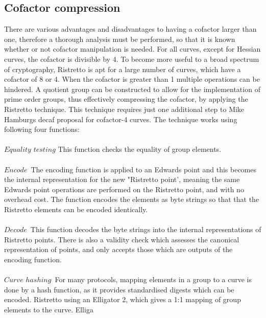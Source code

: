 \documentclass{article}
\begin{document}
\subsection{Cofactor compression}
There are various advantages and disadvantages to having a cofactor larger than one, therefore a thorough analysis must be performed,  so that it is known whether or not cofactor manipulation is needed. For all curves, except for Hessian curves, the cofactor is divisible by 4. To become more useful to a broad spectrum of cryptography, Ristretto is apt for a large number of curves, which have a cofactor of 8 or 4. When the cofactor is greater than 1 multiple operations can be hindered. A quotient group can be constructed to allow for the implementation of prime order groups, thus effectively compressing the cofactor, by applying the Ristretto technique. This technique requires just one additional step to Mike Hamburgs decaf proposal for cofactor-4 curves. The technique works using following four functions:\\\\   
${Equality}$ ${testing}$ This function checks the equality of group elements. \\\\
${Encode}$\ The encoding function is applied to an Edwards point and this becomes the internal representation for the new "Ristretto point', meaning the same Edwards point operations are performed on the Ristretto point, and with no overhead cost. The function encodes the elements as byte strings so that that the Ristretto elements can be encoded identically.\\\\
${Decode}$\ This function decodes the byte strings into the internal representations of Ristretto points. There is also a validity check which assesses the canonical representation of points, and only accepts those which are outputs of the encoding function. \\\\
${Curve}$ ${hashing}$\ For many protocols, mapping elements in a group to a curve is done by a hash function, as it provides standardised digests which can be encoded. Ristretto using an Elligator 2, which gives a 1:1 mapping of group elements to the curve. Elliga
 
\end{document}
